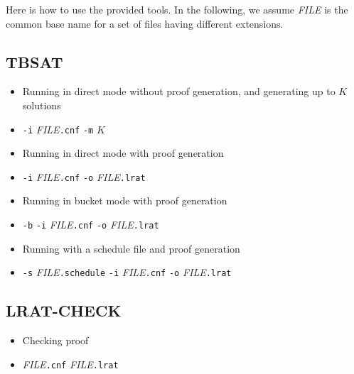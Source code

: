 Here is how to use the provided tools.  In the following, we assume
{\it FILE} is the common base name for a set of files having different extensions.


\subsection*{TBSAT}

\begin{itemize}
\item Running in direct mode without proof generation, and generating up to $K$ solutions
\item[] \texttt{-i} {\it FILE}\texttt{.cnf} \texttt{-m} $K$
\item Running in direct mode with proof generation
\item[] \texttt{-i} {\it FILE}\texttt{.cnf} \texttt{-o} {\it FILE}\texttt{.lrat}
\item Running in bucket mode with proof generation
\item[] \texttt{-b} \texttt{-i} {\it FILE}\texttt{.cnf} \texttt{-o} {\it FILE}\texttt{.lrat}
\item Running with a schedule file and proof generation
\item[] \texttt{-s} {\it FILE}\texttt{.schedule} \texttt{-i} {\it FILE}\texttt{.cnf} \texttt{-o} {\it FILE}\texttt{.lrat}
\end{itemize}

\subsection*{LRAT-CHECK}

\begin{itemize}
\item Checking proof
\item[] {\it FILE}\texttt{.cnf} {\it FILE}\texttt{.lrat}
\end{itemize}



\newpage





